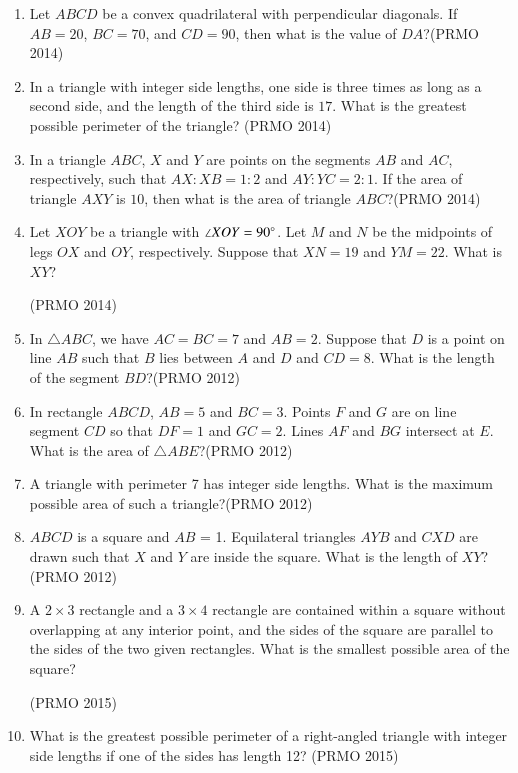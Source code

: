 \begin{enumerate}[label=\thesubsection.\arabic*,ref=\thesubsection.\theenumi]
    \item Let $ABCD$ be a convex quadrilateral with perpendicular diagonals. If $AB = 20$, $BC = 70$, and $CD = 90$, then what is the value of $DA$?\hfill(PRMO 2014)
    \item In a triangle with integer side lengths, one side is three times as long as a second side, and the length of the third side is $17$. What is the greatest possible perimeter of the triangle? \hfill(PRMO 2014)
    \item In a triangle $ABC$, $X$ and $Y$ are points on the segments $AB$ and $AC$, respectively, such that $ AX : XB = 1 : 2 $ and $ AY : YC = 2 : 1$. If the area of triangle $AXY$ is $10$, then what is the area of triangle $ABC$?\hfill(PRMO 2014)
    \item Let $XOY$ be a triangle with $\angle XOY = 90\degree$. Let $M$ and $N$ be the midpoints of legs $OX$ and $OY$, respectively. Suppose that $XN = 19$ and $YM = 22$. What is $XY$?

	    \hfill(PRMO 2014)
\item In $\triangle ABC$, we have $AC = BC = 7$ and $AB = 2$. Suppose that $D$ is a point on line $AB$ such that $B$ lies between $A$ and $D$ and $CD = 8$. What is the length of the segment $BD$?\hfill(PRMO 2012)
\item In rectangle $ABCD$, $AB = 5$ and $BC = 3$. Points $F$ and $G$ are on line segment $CD$ so that $DF = 1$ and $GC = 2$. Lines $AF$ and $BG$ intersect at $E$. What is the area of $\triangle ABE$?\hfill(PRMO 2012)
\item A triangle with perimeter 7 has integer side lengths. What is the maximum possible area of such a triangle?\hfill(PRMO 2012)
\item $ABCD$ is a square and $AB$ = 1. Equilateral triangles $AYB$ and $CXD$ are drawn such that $X$ and $Y$ are inside the square. What is the length of $XY$?\hfill(PRMO 2012)
    \item A $ 2 \times 3 $ rectangle and a $ 3 \times 4 $ rectangle are contained within a square without overlapping at any interior point, and the sides of the square are parallel to the sides of the two given rectangles. What is the smallest possible area of the square? 

	    \hfill(PRMO 2015)

    \item What is the greatest possible perimeter of a right-angled triangle with integer side lengths if one of the sides has length 12? \hfill(PRMO 2015)




\end{enumerate}
